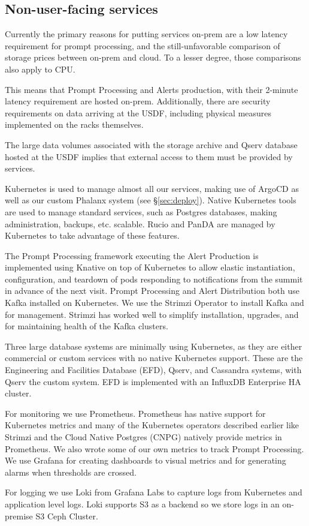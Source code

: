\subsection{Non-user-facing services}

Currently the primary reasons for putting services on-prem are a low
latency requirement for prompt processing, and the still-unfavorable
comparison of storage prices between on-prem and cloud. To a lesser
degree, those comparisons also apply to CPU.

This means that Prompt Processing and Alerts production, with their
2-minute latency requirement are hosted on-prem. Additionally, there
are security requirements on data arriving at the USDF, including
physical measures implemented on the racks themselves.

The large data volumes associated with the storage archive and Qserv
database hosted at the USDF implies that external access to them must be
provided by services.

Kubernetes is used to manage almost all our services, making use of
ArgoCD as well as our custom Phalanx system (see \S \ref{sec:deploy}).
Native Kubernetes tools
are used to manage standard services, such as Postgres databases,
making administration, backups, etc. scalable. Rucio and PanDA are
managed by Kubernetes to take advantage of these features.

The Prompt Processing framework executing the Alert Production is implemented
using Knative on top of
Kubernetes to allow elastic instantiation, configuration, and teardown of
pods responding to notifications from the summit in advance of the
next visit.
Prompt Processing and Alert Distribution both use Kafka installed on Kubernetes.
We use the Strimzi Operator to install Kafka and for management.  Strimzi
has worked well to simplify installation, upgrades, and for maintaining
health of the Kafka clusters.

Three large database systems are minimally using Kubernetes, as they
are either commercial or custom services with no native Kubernetes
support. These are the Engineering and Facilities Database (EFD),
Qserv, and Cassandra systems, with Qserv the custom system.
EFD is implemented with an InfluxDB Enterprise HA cluster.

For monitoring we use Prometheus.  Prometheus has native support for
Kubernetes metrics and many of the Kubernetes operators described earlier
like Strimzi and the Cloud Native Postgres (CNPG) natively provide metrics in Prometheus. We also
wrote some of our own metrics to track Prompt Processing.
We use Grafana for creating dashboards to visual metrics and for generating alarms when thresholds are crossed.

For logging we use Loki from Grafana Labs to capture logs from Kubernetes
and application level logs.  Loki supports S3 as a backend so we store logs
in an on-premise S3 Ceph Cluster.
